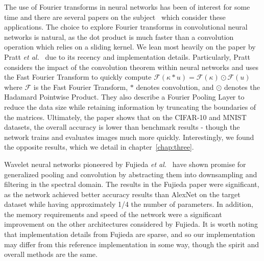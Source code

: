 The use of Fourier transforms in neural networks has been of interest for some time and there are several papers on the subject~\cite{osowski2002fourier, pratt2017fcnn, highlander2016very} which consider these applications.
The choice to explore Fourier transforms in convolutional neural networks is natural, as the dot product is much faster than a convolution operation which relies on a sliding kernel. 
We lean most heavily on the paper by Pratt \textit{et al.}~\cite{pratt2017fcnn} due to its recency and implementation details. 
Particularly, Pratt considers the impact of the convolution theorem within neural networks and uses the Fast Fourier Transform to quickly compute $\mathcal{F}(\kappa * u) = \mathcal{F}(\kappa) \odot \mathcal{F}(u)$ where $\mathcal{F}$ is the Fast Fourier Transform, $*$ denotes convolution, and $\odot$ denotes the Hadamard Pointwise Product.
They also describe a Fourier Pooling Layer to reduce the data size while retaining information by truncating the boundaries of the matrices.
Ultimately, the paper shows that on the CIFAR-10 and MNIST datasets, the overall accuracy is lower than benchmark results - though the network trains and evaluates images much more quickly.
Interestingly, we found the opposite results, which we detail in chapter~\ref{chap:three}.

Wavelet neural networks pioneered by Fujieda \textit{et al.}~\cite{fujieda2017wavelet} have shown promise for generalized pooling and convolution by abstracting them into downsampling and filtering in the spectral domain.
The results in the Fujieda paper were significant, as the network achieved better accuracy results than AlexNet on the target dataset while having approximately 1/4 the number of parameters.
In addition, the memory requirements and speed of the network were a significant improvement on the other architectures considered by Fujieda.
It is worth noting that implementation details from Fujieda are sparse, and so our implementation may differ from this reference implementation in some way, though the spirit and overall methods are the same.

